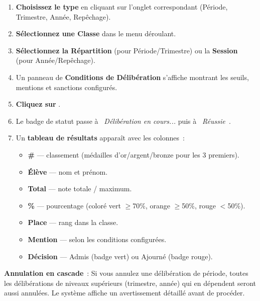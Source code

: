 \begin{etape}[title=Proc\'edure : Lancer une d\'elib\'eration]
\begin{enumerate}[leftmargin=1.5cm,label=\textbf{\arabic*.},itemsep=10pt]
  \item \textbf{Choisissez le type} en cliquant sur l'onglet correspondant (P\'eriode, Trimestre, Ann\'ee, Rep\^echage).
  \item \textbf{S\'electionnez une Classe} dans le menu d\'eroulant.
  \item \textbf{S\'electionnez la R\'epartition} (pour P\'eriode/Trimestre) ou la \textbf{Session} (pour Ann\'ee/Rep\^echage).
  \item Un panneau de \textbf{Conditions de D\'elib\'eration} s'affiche montrant les seuils, mentions et sanctions configur\'es.
  \item \textbf{Cliquez sur} .
  \item Le badge de statut passe \`a \textit{\guillemotleft~D\'elib\'eration en cours...\guillemotright} puis \`a \textit{\guillemotleft~R\'eussie~\guillemotright}.
  \item Un \textbf{tableau de r\'esultats} appara\^it avec les colonnes~:
  \begin{itemize}
    \item \textbf{\#} --- classement (m\'edailles d'or/argent/bronze pour les 3 premiers).
    \item \textbf{\'El\`eve} --- nom et pr\'enom.
    \item \textbf{Total} --- note totale / maximum.
    \item \textbf{\%} --- pourcentage (color\'e vert $\geq$70\%, orange $\geq$50\%, rouge $<$50\%).
    \item \textbf{Place} --- rang dans la classe.
    \item \textbf{Mention} --- selon les conditions configur\'ees.
    \item \textbf{D\'ecision} --- Admis (badge vert) ou Ajourn\'e (badge rouge).
  \end{itemize}
\end{enumerate}
\end{etape}

\begin{danger}
\textbf{Annulation en cascade}~: Si vous annulez une d\'elib\'eration de p\'eriode, toutes les d\'elib\'erations de niveaux sup\'erieurs (trimestre, ann\'ee) qui en d\'ependent seront aussi annul\'ees. Le syst\`eme affiche un avertissement d\'etaill\'e avant de proc\'eder.
\end{danger}

